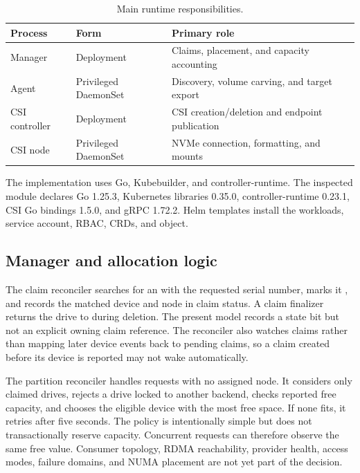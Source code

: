 \documentclass[10pt,a4paper,twocolumn]{article}
\newcommand{\code}[1]{\texttt{\detokenize{#1}}}
\begin{document}
\begin{table}[H]
\centering
\caption{Main runtime responsibilities.}
\label{tab:runtime-v2}
\footnotesize
\begin{tabularx}{\columnwidth}{@{}L{20mm}L{19mm}X@{}}
\toprule
\textbf{Process} & \textbf{Form} & \textbf{Primary role} \\
\midrule
Manager & Deployment & Claims, placement, and capacity accounting \\
Agent & Privileged DaemonSet & Discovery, volume carving, and target export \\
CSI controller & Deployment & CSI creation/deletion and endpoint publication \\
CSI node & Privileged DaemonSet & NVMe connection, formatting, and mounts \\
\bottomrule
\end{tabularx}
\end{table}

The implementation uses Go, Kubebuilder, and controller-runtime. The inspected
module declares Go 1.25.3, Kubernetes libraries 0.35.0,
controller-runtime 0.23.1, CSI Go bindings 1.5.0, and gRPC 1.72.2. Helm
templates install the workloads, service account, RBAC, CRDs, and
\code{CSIDriver} object.

\subsection{Manager and allocation logic}

The claim reconciler searches for an \code{NVMeDevice} with the requested
serial number, marks it \code{Claimed}, and records the matched device and node
in claim status. A claim finalizer returns the drive to \code{Available} during
deletion. The present model records a state bit but not an explicit owning
claim reference. The reconciler also watches claims rather than mapping later
device events back to pending claims, so a claim created before its device is
reported may not wake automatically.

The partition reconciler handles requests with no assigned node. It considers
only claimed drives, rejects a drive locked to another backend, checks
reported free capacity, and chooses the eligible device with the most free
space. If none fits, it retries after five seconds. The policy is intentionally
simple but does not transactionally reserve capacity. Concurrent requests can
therefore observe the same free value. Consumer topology, RDMA reachability,
provider health, access modes, failure domains, and NUMA placement are not yet
part of the decision.
\end{document}
